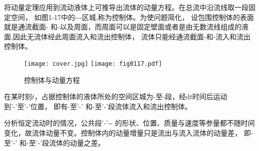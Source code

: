 将动量定理应用到流动液体上可推导出流体的动量方程。在总流中沿流线取一段固定空间，
如图1-17中的\uppercase\expandafter{}-\uppercase\expandafter{}-\uppercase\expandafter{}-\uppercase\expandafter{}区城,称为控制体。为使问题简化，
设包围控制体的表面就是通流截面\uppercase\expandafter{}-\uppercase\expandafter{}
和\uppercase\expandafter{}-\uppercase\expandafter{}以及周面，而周面可以是固定壁面或者是由无数流线组成的液面,因此无流体经此周面流入和流出控制体，
流体只能经通流截面\uppercase\expandafter{}-\uppercase\expandafter{}和\uppercase\expandafter{}-\uppercase\expandafter{}流入和流出控制体。

\begin{figure}
  \centering
  \ifOpenSource
  \texttt{[image: cover.jpg]}   
  \else
  \texttt{[image: fig0117.pdf]}
  \fi
  \caption{控制体与动量方程}
  \label{fig:fig0117}
  \end{figure}

在某时刻$t$，占据控制体的液体所处的空间区城为\uppercase\expandafter{}-\uppercase\expandafter{}至\uppercase\expandafter{}-\uppercase\expandafter{}段，经d$t$时间后运动
到\uppercase\expandafter{}'-\uppercase\expandafter{}'至\uppercase\expandafter{}'-\uppercase\expandafter{}'位置，
即有\uppercase\expandafter{}-\uppercase\expandafter{}至\uppercase\expandafter{}'-\uppercase\expandafter{}'
和\uppercase\expandafter{}-\uppercase\expandafter{}至\uppercase\expandafter{}'-\uppercase\expandafter{}'段流体流入和流出控制体。

分析恒定流动时的情况，公共段\uppercase\expandafter{}'-\uppercase\expandafter{}'-\uppercase\expandafter{}-\uppercase\expandafter{}
的形状、位置、质量与速度等参量都不随时间变化，故流体动量不变。控制体内的动量增量只是流出与流入流体的动量差，
即\uppercase\expandafter{}-\uppercase\expandafter{}至\uppercase\expandafter{}'-\uppercase\expandafter{}'
和\uppercase\expandafter{}-\uppercase\expandafter{}至\uppercase\expandafter{}'-\uppercase\expandafter{}'段流体的动量之差。


